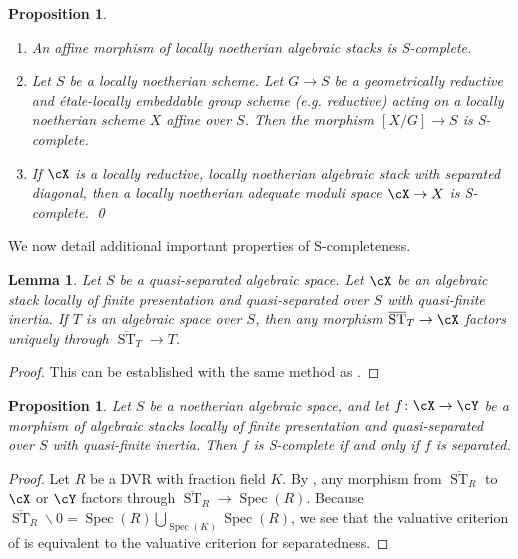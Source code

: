 \documentclass[a4paper]{amsart}
\numberwithin{equation}{section}
\theoremstyle{plain}
\newtheorem{lem}[thm]{Lemma}
\newtheorem{prop}[thm]{Proposition}
\theoremstyle{definition}
\newcommand{\epf}{\qed \vspace{+10pt}}
\DeclareMathOperator{\Spec}{Spec}
\DeclareMathOperator{\ST}{ST}
\newcommand{\co}{\colon}
\def\oST{\overline{\ST}}
\begin{document}
\begin{prop} \label{P:S-complete} \quad
\begin{enumerate}
\item  \label{P:S-complete-affine}
	An affine morphism of locally noetherian algebraic stacks is {\textsf{S}}-complete.
\item \label{P:S-complete-quotient}
		Let $S$ be a locally noetherian scheme.  Let $G \to S$ be a geometrically reductive and \'etale-locally embeddable group scheme (e.g. reductive) acting on a locally noetherian scheme $X$ affine over $S$.  Then the morphism $[X/G] \to S$ is {\textsf{S}}-complete.
\item \label{P:S-complete-gms}
	If $\cX$ is a locally reductive, locally noetherian algebraic stack with separated diagonal, then a locally noetherian adequate moduli space $\cX \to X$ is {\textsf{S}}-complete.	\epf
\end{enumerate} 
\end{prop}

We now detail additional important properties of {\textsf{S}}-completeness.

\begin{lem} \label{L:quasi-finite-factoring-S-complete}
	Let $S$ be a quasi-separated algebraic space. Let $\cX$ be an algebraic stack locally of finite presentation and quasi-separated over $S$ with quasi-finite inertia.  If $T$ is an algebraic space over $S$, then any morphism $\oST_T \to \cX$ factors uniquely through $\oST_T \to T$.
\end{lem}

\begin{proof} This can be established with the same method as .
\end{proof}

\begin{prop}  \label{P:quasi-finite-S-complete}
	Let $S$ be a noetherian algebraic space, and 
	let $f \co \cX \to \cY$ be a morphism of algebraic stacks locally of finite presentation and quasi-separated over $S$ with quasi-finite inertia.  Then $f$ is {\textsf{S}}-complete if and only if $f$ is separated.
\end{prop}

\begin{proof}
Let $R$ be a DVR with fraction field $K$.  By , any morphism from $\oST_R$ to $\cX$ or $\cY$ factors through $\oST_R \to \Spec(R)$. Because $\oST_R \smallsetminus 0 = \Spec(R) \bigcup_{\Spec(K)} \Spec(R)$, we see that the valuative criterion of  is equivalent to the valuative criterion for separatedness.
\end{proof}
\end{document}
